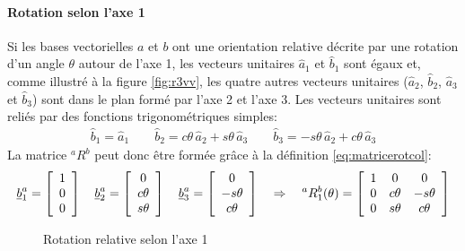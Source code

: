 \paragraph{Rotation selon l'axe 1}
%
Si les bases vectorielles $a$ et $b$ ont une orientation relative décrite par une rotation d'un angle $\theta$ autour de l'axe 1, les vecteurs unitaires $\hat{a}_1$ et $\hat{b}_1$ sont égaux et, comme illustré à la figure \ref{fig:r3vv}, les quatre autres vecteurs unitaires ($\hat{a}_2$, $\hat{b}_2$, $\hat{a}_3$ et $\hat{b}_3$) sont dans le plan formé par l'axe 2 et l'axe 3. Les vecteurs unitaires sont reliés par des fonctions trigonométriques simples:
\begin{align}
	\hat{b}_1 = \hat{a}_1 \quad\quad
	\hat{b}_2 = c\theta \, \hat{a}_2 + s\theta \, \hat{a}_3 \quad\quad
	\hat{b}_3 = -s\theta \, \hat{a}_2 + c\theta \, \hat{a}_3
	\label{eq:rot1vecuni}
\end{align}
La matrice $^aR^b$ peut donc être formée grâce à la définition \eqref{eq:matricerotcol}:
\begin{align}
	\underline{b}_1^a = \left[ \begin{array}{c} 1 \\ 0 \\ 0  \end{array} \right] \quad
	\underline{b}_2^a = \left[ \begin{array}{c} 0 \\ c\theta \\ s\theta  \end{array} \right] \quad
	\underline{b}_3^a = \left[ \begin{array}{c} 0 \\ -s\theta \\ c\theta  \end{array} \right]
	\quad \Rightarrow \quad
	^aR^b_1(\theta)
	= \left[ \begin{array}{c c c}
				 1 & 0 & 0 \\
				 0 & c\theta  & -s\theta \\
				 0 & s\theta & c\theta
	\end{array}  \right]
	\label{eq:rot1theta}
\end{align}
%
\begin{figure}[H]
	\centering
	\hspace{+20pt}
	\caption{Rotation relative selon l'axe 1}
	\label{fig:r1vv}
\end{figure}


